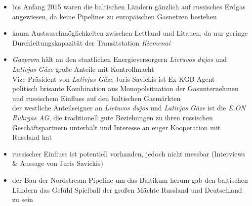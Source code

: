 \documentclass[11pt,a4paper]{article}
\begin{document}
\vspace{2cm}

\begin{itemize}


\item bis Anfang 2015 waren die baltischen Ländern gänzlich auf russisches Erdgas angewiesen, da keine Pipelines zu europäischen Gasnetzen bestehen

\item kaum Austauschmöglichkeiten zwischen Lettland und Litauen, da nur geringe Durchleitungskapazität der Transitstation \textsl{Kiemenai}

\item \textsl{Gazprom} hält an den staatlichen Energieversorgern \emph{Lietuvos dujos} und \emph{Lativjas G\={a}ze} große Anteile mit Kontrollmacht\\
 Vize-Präsident von \emph{Lativjas G\={a}ze} Juris Savickis ist Ex-KGB Agent\\
 politisch brisante Kombination aus Monopolsituation der Gasunternehmen und russischem Einfluss auf den baltischen Gasmärkten\\
 der westliche Anteilseigner an \emph{Lietuvos dujos} und \emph{Lativjas G\={a}ze} ist die \emph{E.ON Ruhrgas AG}, die traditionell gute Beziehungen zu ihren russischen Geschäftspartnern unterhält und Interesse an enger Kooperation mit Russland hat

\item russischer Einfluss ist potentiell vorhanden, jedoch nicht messbar (Interviews \& Aussage von Juris Savickis)

\item der Bau der Nordstream-Pipeline um das Baltikum herum gab den baltischen Ländern das Gefühl Spielball der großen Mächte Russland und Deutschland zu sein


\end{itemize}

\subsection*{}
\end{document}
